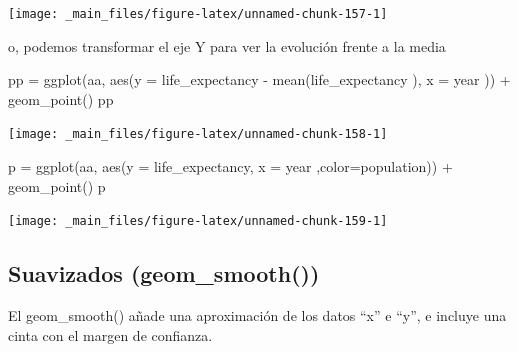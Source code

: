 \documentclass[
]{book}
\newenvironment{Shaded}{\begin{snugshade}}{\end{snugshade}}
\newcommand{\AttributeTok}[1]{\textcolor[rgb]{0.77,0.63,0.00}{#1}}
\newcommand{\FunctionTok}[1]{\textcolor[rgb]{0.00,0.00,0.00}{#1}}
\newcommand{\NormalTok}[1]{#1}
\newcommand{\OtherTok}[1]{\textcolor[rgb]{0.56,0.35,0.01}{#1}}
\newcommand{\SpecialCharTok}[1]{\textcolor[rgb]{0.00,0.00,0.00}{#1}}
\begin{document}
\begin{center}\texttt{[image: \_main\_files/figure-latex/unnamed-chunk-157-1]} \end{center}

o, podemos transformar el eje Y para ver la evolución frente a la media

\begin{Shaded}
\begin{Highlighting}[]
\NormalTok{pp }\OtherTok{=} \FunctionTok{ggplot}\NormalTok{(aa, }\FunctionTok{aes}\NormalTok{(}\AttributeTok{y =}\NormalTok{ life\_expectancy }\SpecialCharTok{{-}} \FunctionTok{mean}\NormalTok{(life\_expectancy ), }\AttributeTok{x =}\NormalTok{ year )) }\SpecialCharTok{+}
  \FunctionTok{geom\_point}\NormalTok{()}
\NormalTok{pp}
\end{Highlighting}
\end{Shaded}

\begin{center}\texttt{[image: \_main\_files/figure-latex/unnamed-chunk-158-1]} \end{center}

\begin{Shaded}
\begin{Highlighting}[]
\NormalTok{p }\OtherTok{=} \FunctionTok{ggplot}\NormalTok{(aa, }\FunctionTok{aes}\NormalTok{(}\AttributeTok{y =}\NormalTok{ life\_expectancy, }\AttributeTok{x =}\NormalTok{ year ,}\AttributeTok{color=}\NormalTok{population)) }\SpecialCharTok{+}
  \FunctionTok{geom\_point}\NormalTok{()}
\NormalTok{p}
\end{Highlighting}
\end{Shaded}

\begin{center}\texttt{[image: \_main\_files/figure-latex/unnamed-chunk-159-1]} \end{center}

\hypertarget{suavizados-geom_smooth}{%
\subsection{Suavizados (geom\_smooth())}\label{suavizados-geom_smooth}}

El geom\_smooth() añade una aproximación de los datos ``x'' e ``y'', e incluye una cinta con el margen de confianza.
\end{document}
